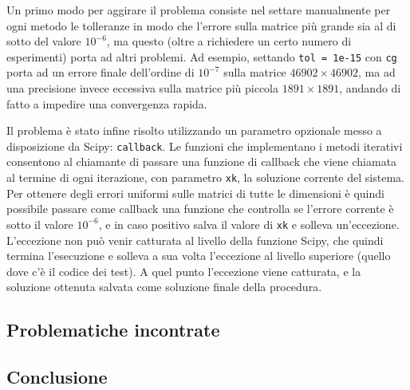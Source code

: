 \documentclass[11pt,a4paper]{scrartcl}
\begin{document}
Un primo modo per aggirare il problema consiste nel settare manualmente per ogni metodo le tolleranze in modo che l'errore sulla matrice più grande sia al di sotto del valore $10^{-6}$, ma questo (oltre a richiedere un certo numero di esperimenti) porta ad altri problemi. Ad esempio, settando \texttt{tol = 1e-15} con \texttt{cg} porta ad un errore finale dell'ordine di $10^{-7}$ sulla matrice $46902 \times 46902$, ma ad una precisione invece eccessiva sulla matrice più piccola $1891 \times 1891$, andando di fatto a impedire una convergenza rapida.

Il problema è stato infine risolto utilizzando un parametro opzionale messo a disposizione da Scipy: \texttt{callback}. Le funzioni che implementano i metodi iterativi consentono al chiamante di passare una funzione di callback che viene chiamata al termine di ogni iterazione, con parametro \texttt{xk}, la soluzione corrente del sistema. Per ottenere degli errori uniformi sulle matrici di tutte le dimensioni è quindi possibile passare come callback una funzione che controlla se l'errore corrente è sotto il valore $10^{-6}$, e in caso positivo salva il valore di \texttt{xk} e solleva un'eccezione. L'eccezione non può venir catturata al livello della funzione Scipy, che quindi termina l'esecuzione e solleva a sua volta l'eccezione al livello superiore (quello dove c'è il codice dei test). A quel punto l'eccezione viene catturata, e la soluzione ottenuta salvata come soluzione finale della procedura.



\subsection*{Problematiche incontrate}

\subsection*{Conclusione}
\end{document}
